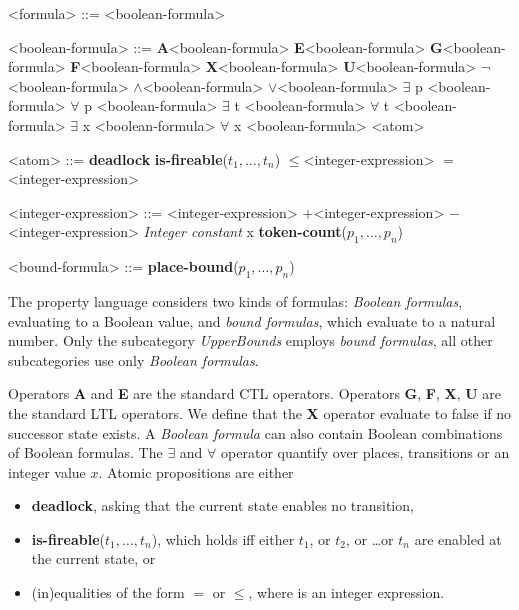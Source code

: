 \documentclass[10pt,english,a4paper]{article}
\newcommand\N                {\mathbb{N}}
\newcommand\ctla             {\textbf{A}\xspace}
\newcommand\ctle             {\textbf{E}\xspace}
\newcommand\ltlf             {\textbf{F}\xspace}
\newcommand\ltlg             {\textbf{G}\xspace}
\newcommand\ltlx             {\textbf{X}\xspace}
\newcommand\ltlu             {\textbf{U}\xspace}
\newcommand\logicnot         {\boldmath$\lnot$\xspace}
\newcommand\logicand         {\boldmath$\land$\xspace}
\newcommand\logicor          {\boldmath$\lor$\xspace}
\newcommand\quantexist       {\boldmath$\exists$\xspace}
\newcommand\quantall         {\boldmath$\forall$\xspace}
\newcommand\atomleq          {\boldmath$\leq$\xspace}
\newcommand\atomeq          {\boldmath$=$\xspace}
\newcommand\atomdead         {\textbf{deadlock}\xspace}
\newcommand\atomisfire[1]    {\textbf{is-fireable}(#1)}
\newcommand\atomplacebnd[1]  {\textbf{place-bound}(#1)}
\newcommand\atomtokenscnt[1] {\textbf{token-count}(#1)}
\newcommand\exprplus         {\boldmath$+$\xspace}
\newcommand\exprminus        {\boldmath$-$\xspace}
\begin{document}
\begin{grammar}
<formula> ::= <boolean-formula>

<boolean-formula> ::= \ctla <boolean-formula>
\alt \ctle <boolean-formula>
\alt \ltlg <boolean-formula>
\alt \ltlf <boolean-formula>
\alt \ltlx <boolean-formula>
 \ltlu <boolean-formula>
\alt \logicnot <boolean-formula>
 \logicand <boolean-formula>
 \logicor <boolean-formula>
\alt \quantexist p <boolean-formula>
\alt \quantall p <boolean-formula>
\alt \quantexist t <boolean-formula>
\alt \quantall t <boolean-formula>
\alt \quantexist x <boolean-formula>
\alt \quantall x <boolean-formula>
\alt <atom>

<atom> ::= \atomdead
\alt \atomisfire{$t_1, \ldots, t_n$}
 \atomleq <integer-expression>
 \atomeq <integer-expression>

<integer-expression> ::=
     <integer-expression> \exprplus <integer-expression>
 \exprminus <integer-expression>
\alt \textit{Integer constant}
\alt x
\alt \atomtokenscnt{$p_1, \ldots, p_n$}

<bound-formula> ::= \atomplacebnd{$p_1, \ldots, p_n$}

\end{grammar}

The property language considers two kinds of formulas:
\textit{Boolean formulas},
evaluating to a Boolean value, and \textit{bound formulas},
which evaluate to
a natural number.
Only the subcategory
\textit{UpperBounds} employs \textit{bound formulas}, all other
subcategories use only \textit{Boolean formulas}.

Operators \ctla and \ctle are the standard CTL operators.
Operators
\ltlg,
\ltlf,
\ltlx,
\ltlu
are the standard LTL operators.
We define that the \ltlx operator evaluate to false if no successor state
exists.  A \textit{Boolean formula} can also contain Boolean combinations of Boolean
formulas.
The \quantexist and \quantall operator quantify over places, transitions or an integer value $x$.
Atomic propositions are either
\begin{itemize}
\item
  \atomdead, asking that the current state enables no transition,
\item
  \atomisfire{$t_1, \ldots, t_n$}, which holds iff either $t_1$, or $t_2$,
  or \ldots or $t_n$ are enabled at the current state, or
\item
  (in)equalities of the form  \atomeq {} or  \atomleq {},
  where  is an integer expression.
\end{itemize}
\end{document}
